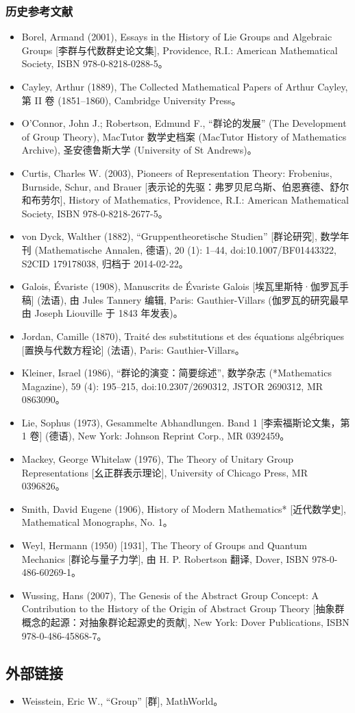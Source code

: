 \subsubsection{历史参考文献}  
\begin{itemize}
\item Borel, Armand (2001), Essays in the History of Lie Groups and Algebraic Groups [李群与代数群史论文集], Providence, R.I.: American Mathematical Society, ISBN 978-0-8218-0288-5。  
\item Cayley, Arthur (1889), The Collected Mathematical Papers of Arthur Cayley, 第 II 卷 (1851–1860), Cambridge University Press。  
\item O'Connor, John J.; Robertson, Edmund F., “群论的发展” (The Development of Group Theory), MacTutor 数学史档案 (MacTutor History of Mathematics Archive), 圣安德鲁斯大学 (University of St Andrews)。  
\item Curtis, Charles W. (2003), Pioneers of Representation Theory: Frobenius, Burnside, Schur, and Brauer [表示论的先驱：弗罗贝尼乌斯、伯恩赛德、舒尔和布劳尔], History of Mathematics, Providence, R.I.: American Mathematical Society, ISBN 978-0-8218-2677-5。  
\item von Dyck, Walther (1882), “Gruppentheoretische Studien” [群论研究], 数学年刊 (Mathematische Annalen, 德语), 20 (1): 1–44, doi:10.1007/BF01443322, S2CID 179178038, 归档于 2014-02-22。  
\item Galois, Évariste (1908), Manuscrits de Évariste Galois [埃瓦里斯特·伽罗瓦手稿] (法语), 由 Jules Tannery 编辑, Paris: Gauthier-Villars (伽罗瓦的研究最早由 Joseph Liouville 于 1843 年发表)。  
\item Jordan, Camille (1870), Traité des substitutions et des équations algébriques [置换与代数方程论] (法语), Paris: Gauthier-Villars。  
\item Kleiner, Israel (1986), “群论的演变：简要综述”, 数学杂志 (*Mathematics Magazine), 59 (4): 195–215, doi:10.2307/2690312, JSTOR 2690312, MR 0863090。  
\item Lie, Sophus (1973), Gesammelte Abhandlungen. Band 1 [李索福斯论文集，第 1 卷] (德语), New York: Johnson Reprint Corp., MR 0392459。  
\item Mackey, George Whitelaw (1976), The Theory of Unitary Group Representations [幺正群表示理论], University of Chicago Press, MR 0396826。  
\item Smith, David Eugene (1906), History of Modern Mathematics* [近代数学史], Mathematical Monographs, No. 1。  
\item Weyl, Hermann (1950) [1931], The Theory of Groups and Quantum Mechanics [群论与量子力学], 由 H. P. Robertson 翻译, Dover, ISBN 978-0-486-60269-1。  
\item Wussing, Hans (2007), The Genesis of the Abstract Group Concept: A Contribution to the History of the Origin of Abstract Group Theory [抽象群概念的起源：对抽象群论起源史的贡献], New York: Dover Publications, ISBN 978-0-486-45868-7。  
\end{itemize}
\subsection{外部链接}  
\begin{itemize}
\item Weisstein, Eric W., “Group” [群], MathWorld。
\end{itemize}
